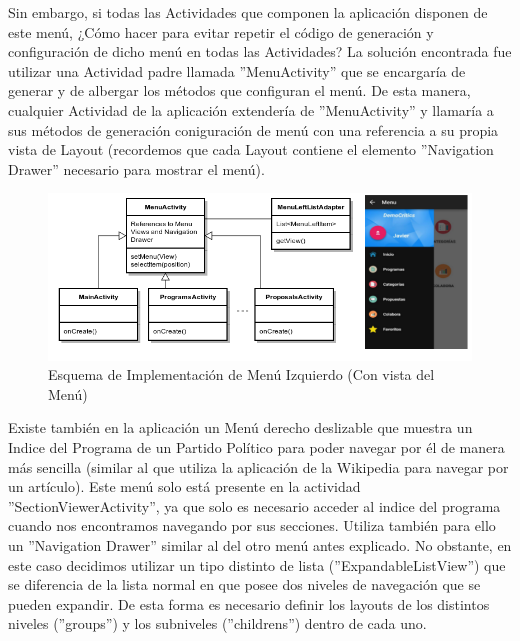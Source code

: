 		Sin embargo, si todas las Actividades que componen la aplicación disponen de este menú, ¿Cómo hacer para evitar repetir el código de generación y configuración de dicho menú en todas las Actividades? La solución encontrada fue utilizar una Actividad padre llamada ''MenuActivity'' que se encargaría de generar y de albergar los métodos que configuran el menú. De esta manera, cualquier Actividad de la aplicación extendería de ''MenuActivity'' y llamaría a sus métodos de generación  coniguración de menú con una referencia a su propia vista de Layout (recordemos que cada Layout contiene el elemento ''Navigation Drawer'' necesario para mostrar el menú).
		
	\begin{figure}[H]
	  \centering
	    \includegraphics[keepaspectratio, scale=0.6]{Media/Diagrams/classMenuLeft.png}
	  \caption{Esquema de Implementación de Menú Izquierdo (Con vista del Menú)}
	  \label{fig:topItemArch}
	\end{figure}	
	
	Existe también en la aplicación un Menú derecho deslizable que muestra un Indice del Programa de un Partido Político para poder navegar por él de manera más sencilla (similar al que  utiliza la aplicación de la Wikipedia para navegar por un artículo). Este menú solo está presente en la actividad ''SectionViewerActivity'', ya que solo es necesario acceder al indice del programa cuando nos encontramos navegando por sus secciones. Utiliza también   para ello un ''Navigation Drawer'' similar al del otro menú antes explicado. No obstante, en este caso decidimos utilizar un tipo distinto de lista (''ExpandableListView'') que se diferencia de la lista normal en que posee dos niveles de navegación que se pueden expandir. De esta forma es necesario definir los layouts de los distintos niveles (''groups'') y los subniveles (''childrens'') dentro de cada uno. 
	
